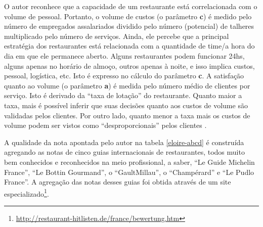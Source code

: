 \documentclass[a4paper, 12pt, openright, oneside, german, french, english, brazil]{abntex2}
\begin{document}
	O autor reconhece que a capacidade de um restaurante está correlacionada com o volume de pessoal. Portanto, o volume de custos (o parâmetro \textbf{c}) é medido pelo número de empregados assalariados dividido pelo número (potencial) de talheres multiplicado pelo número de serviços. Ainda, ele percebe que a principal estratégia dos restaurantes está relacionada com a quantidade de time/a hora do dia em que ele permanece aberto. Alguns restaurantes podem funcionar 24hs, alguns apenas no horário de almoço, outros apenas à noite, e isso implica custos, pessoal, logística, etc. Isto é expresso no cálculo do parâmetro \textbf{c}. A satisfação quanto ao volume (o parâmetro \textbf{a}) é medida pelo número médio de clientes por serviço. Isto é derivado da ``taxa de lotação'' do restaurante. Quanto maior a taxa, mais é possível inferir que suas decisões quanto aos custos de volume são validadas pelos clientes. Por outro lado, quanto menor a taxa mais os custos de volume podem ser vistos como ``desproporcionais'' pelos clientes \cite{eloire2009reseaux}.
	
	
	A qualidade da nota apontada pelo autor na tabela \ref{eloire-abcd} é construída agregando as notas de cinco guias internacionais de restaurantes, todos muito bem conhecidos e reconhecidos na meio profissional, a saber, ``Le Guide Michelin France'', ``Le Bottin Gourmand'', o ``GaultMillau'', o ``Champérard'' e ``Le Pudlo France''. A agregação das notas desses guias foi obtida através de um site especializado\footnote{\url{http://restaurant-hitlisten.de/france/bewertung.htm}}.
	
	
	
\end{document}
